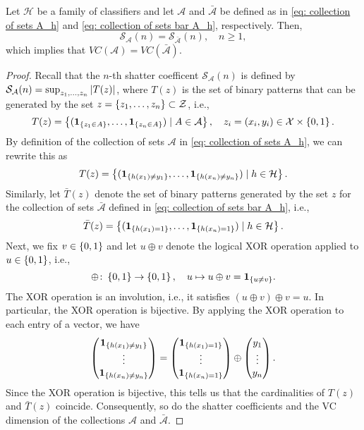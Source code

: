 \begin{theorem}
Let $\mathcal{H}$ be a family of classifiers and let $\mathcal{A}$ and $\bar{\mathcal{A}}$ be defined as in \eqref{eq: collection of sets A_h} and \eqref{eq: collection of sets bar A_h}, respectively. Then,
\[
    \mathcal{S}_{\mathcal{A}}(n) = \mathcal{S}_{\bar{\mathcal{A}}}(n), \quad n \geq 1,
\]
which implies that $VC(\mathcal{A}) = VC(\bar{\mathcal{A}})$.
\end{theorem}

\begin{proof}
Recall that the $n$-th shatter coefficent $\mathcal{S}_{\mathcal{A}}(n)$ is defined by $\mathcal{S}_{\mathcal{A}}(n) = \sup_{z_1, \dots, z_n} \abs{T(z)}$, where $T(z)$ is the set of binary patterns that can be generated by the set $z = \left\{z_1, \dots, z_n\right\} \subset \mathcal{Z}$, i.e.,
\[
    T(z) = \left\{(\mathbf{1}_{\left\{z_1 \in A\right\}}, \dots, \mathbf{1}_{\left\{z_n \in A\right\}}) \mathrel{|} A \in \mathcal{A}\right\}, \quad z_i = (x_i, y_i) \in \mathcal{X} \times \left\{0, 1\right\}.
\]
By definition of the collection of sets $\mathcal{A}$ in \eqref{eq: collection of sets A_h}, we can rewrite this as
\[
    T(z) = \left\{(\mathbf{1}_{\left\{h(x_1) \neq y_1\right\}}, \dots, \mathbf{1}_{\left\{h(x_n) \neq y_n\right\}}) \mathrel{|} h \in \mathcal{H}\right\}.
\]
Similarly, let $\bar T(z)$ denote the set of binary patterns generated by the set $z$ for the collection of sets $\bar{\mathcal{A}}$ defined in \eqref{eq: collection of sets bar A_h}, i.e.,
\[
    \bar T(z) = \left\{(\mathbf{1}_{\left\{h(x_1) = 1\right\}}, \dots, \mathbf{1}_{\left\{h(x_n) = 1\right\}}) \mathrel{|} h \in \mathcal{H}\right\}.
\]
Next, we fix $v \in \left\{0, 1\right\}$ and let $u \oplus v$ denote the logical XOR operation applied to $u \in \left\{0, 1\right\}$, i.e.,
\[
    \oplus \colon \left\{0, 1\right\} \to \left\{0, 1\right\}, \quad u \mapsto u \oplus v = \mathbf{1}_{\left\{u \neq v\right\}}.
\]
The XOR operation is an involution, i.e., it satisfies $(u \oplus v) \oplus v = u$. In particular, the XOR operation is bijective. By applying the XOR operation to each entry of a vector, we have
\[
    \begin{pmatrix}
        \mathbf{1}_{\left\{h(x_1) \neq y_1\right\}} \\
        \vdots \\
        \mathbf{1}_{\left\{h(x_n) \neq y_n\right\}}
    \end{pmatrix} =
    \begin{pmatrix}
        \mathbf{1}_{\left\{h(x_1) = 1\right\}} \\
        \vdots \\
        \mathbf{1}_{\left\{h(x_n) = 1\right\}}
    \end{pmatrix} \oplus
    \begin{pmatrix}
        y_1 \\
        \vdots \\
        y_n
    \end{pmatrix}.
\]
Since the XOR operation is bijective, this tells us that the cardinalities of $T(z)$ and $\bar T(z)$ coincide. Consequently, so do the shatter coefficients and the VC dimension of the collections $\mathcal{A}$ and $\bar{\mathcal{A}}$.
\end{proof}

